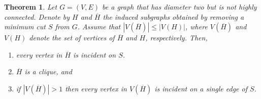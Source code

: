 \documentclass[paper=a4,fontsize=11pt,DIV=8,BCOR=5mm,twoside,pdftex,bibtotocnumbered]{scrreprt}
\theoremstyle{plain}
\newtheorem{thm}{Theorem}
\begin{document}
\begin{thm}\label{thm:diameter_clique}
	Let $G=(V,E)$ be a graph that has diameter two but is not highly connected. Denote by $H$ and $\overline{H}$ the induced subgraphs obtained by removing a minimum cut $S$ from $G$. Assume that $|V(\overline H)| \le |V(H)|$, where $V(\overline H)$ and $V(H)$ denote the set of vertices of $\overline H$ and $H$, respectively. Then,
	\begin{enumerate}
		\item every vertex in $\overline H$ is incident on $S$.
		\item $\overline H$ is a clique, and
		\item if $|V(\overline H)|>1$ then every vertex in $V(\overline H)$ is incident on a single edge of $S$.
	\end{enumerate}
\end{thm}
\end{document}
